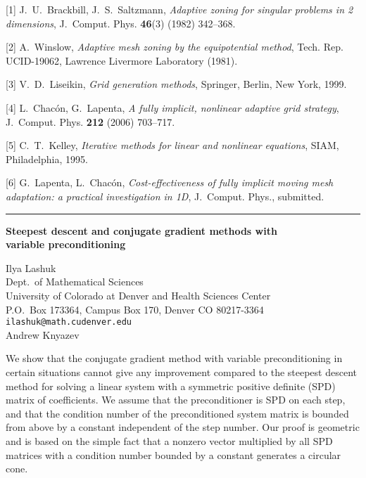 \documentclass[twosided]{report}
\begin{document}
[1] J.~U.~Brackbill, J.~S.~Saltzmann,
{\em Adaptive zoning for singular problems in 2 dimensions},
J.~Comput. Phys. {\bf 46}(3) (1982) 342--368.

[2] A.~Winslow,
{\em Adaptive mesh zoning by the equipotential method},
Tech. Rep. UCID-19062, Lawrence Livermore Laboratory (1981).

[3] V.~D.~Liseikin,
{\em Grid generation methods}, Springer, Berlin, New York, 1999.


[4] L.~Chac\'{o}n, G.~Lapenta,
{\em A fully implicit, nonlinear adaptive grid strategy},
J.~Comput. Phys. {\bf 212} (2006) 703--717.

[5] C.~T.~Kelley,
{\em Iterative methods for linear and nonlinear equations},
SIAM, Philadelphia, 1995.


[6] G.~Lapenta, L.~Chac\'{o}n,
{\em Cost-effectiveness of fully implicit moving mesh
adaptation: a practical investigation in 1D},
J.~Comput. Phys., submitted.



	\begin{center} \rule{6in}{1pt} \end{center}

\begin{center}
{\large			%
{\bf Steepest descent and conjugate gradient methods with \\
	variable preconditioning}}

	Ilya Lashuk \\
	Dept.~of Mathematical Sciences \\
	University of Colorado at Denver and Health Sciences Center \\
	P.O.~Box 173364, Campus Box 170, Denver CO 80217-3364 \\
	{\tt ilashuk@math.cudenver.edu} \\
	Andrew Knyazev
\end{center}
We show that the conjugate gradient method with variable
preconditioning in certain situations cannot give any
improvement compared to the steepest descent method for
solving a linear system with a symmetric positive definite
(SPD) matrix of coefficients. We assume that the
preconditioner is SPD on each step, and that the condition
number of the preconditioned system matrix is bounded from
above by a constant independent of the step number. Our
proof is geometric and is based on the simple fact that a
nonzero vector multiplied by all SPD matrices with a
condition number bounded by a constant generates a circular
cone.
\end{document}
